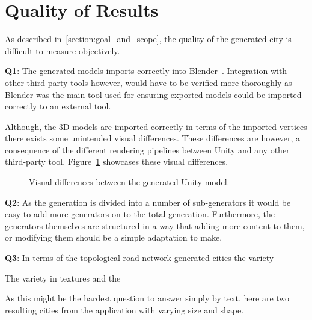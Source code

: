 \section{Quality of Results}

As described in~\ref{section:goal_and_scope}, the quality of the generated city is difficult to measure objectively.

\textbf{Q1}: \newline
The generated models imports correctly into Blender~\cite{blender}.
Integration with other third-party tools however, would have to be verified more thoroughly as Blender was the main tool used for ensuring exported models could be imported correctly to an external tool. 

Although, the 3D models are imported correctly in terms of the imported vertices there exists some unintended visual differences.
These differences are however, a consequence of the different rendering pipelines between Unity and any other third-party tool.
Figure~\ref{fig:blender_shading_result} showcases these visual differences.

\begin{figure}[h!]
  \centering
  \caption{Visual differences between the generated Unity model.}
  \label{fig:blender_shading_result}
\end{figure}

\textbf{Q2}: \newline
As the generation is divided into a number of sub-generators it would be easy to add more generators on to the total generation.
Furthermore, the generators themselves are structured in a way that adding more content to them, or modifying them should be a simple adaptation to make. 

\textbf{Q3}: \newline
In terms of the topological road network generated cities the variety 

The variety in textures and the 

As this might be the hardest question to answer simply by text, here are two resulting cities from the application with varying size and shape.

